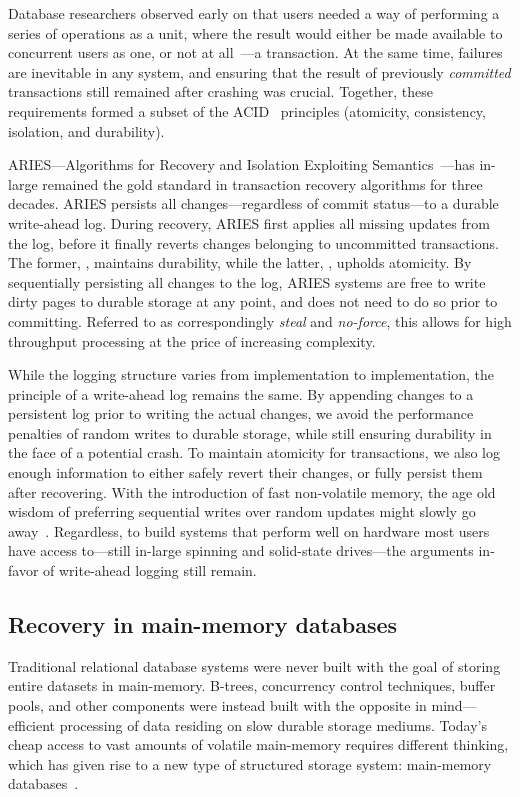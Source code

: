 Database researchers observed early on that users needed a way of
performing a series of operations as a unit, where the result would either be
made available to concurrent users as one, or not at all~\cite{bernstein}---a
transaction. At the same time, failures are inevitable in any system, and
ensuring that the result of previously \textit{committed} transactions still
remained after crashing was crucial. Together, these requirements formed
a subset of the ACID~\cite{acid} principles (atomicity, consistency, isolation,
and durability).

ARIES---Algorithms for Recovery and Isolation Exploiting
Semantics~\cite{aries}---has in-large remained the gold standard in transaction
recovery algorithms for three decades. ARIES persists all changes---regardless
of commit status---to a durable write-ahead log. During recovery, ARIES first
applies all missing updates from the log, before it finally reverts changes
belonging to uncommitted transactions. The former, , maintains
durability, while the latter, , upholds atomicity. By sequentially
persisting all changes to the log, ARIES systems are free to write dirty pages
to durable storage at any point, and does not need to do so prior to committing.
Referred to as correspondingly \textit{steal} and \textit{no-force}, this allows
for high throughput processing at the price of increasing complexity.

While the logging structure varies from implementation to implementation, the
principle of a write-ahead log remains the same. By appending changes to a
persistent log prior to writing the actual changes, we avoid the performance
penalties of random writes to durable storage, while still ensuring durability
in the face of a potential crash. To maintain atomicity for transactions, we
also log enough information to either safely revert their changes, or fully
persist them after recovering. With the introduction of fast non-volatile
memory, the age old wisdom of preferring sequential writes over random updates
might slowly go away~\cite{mars, wbl}. Regardless, to build systems that perform
well on hardware most users have access to---still in-large spinning and
solid-state drives---the arguments in-favor of write-ahead logging still remain.

\subsection{Recovery in main-memory databases}

Traditional relational database systems were never built with the goal of
storing entire datasets in main-memory. B-trees, concurrency control techniques,
buffer pools, and other components were instead built with the opposite in
mind---efficient processing of data residing on slow durable storage mediums.
Today's cheap access to vast amounts of volatile main-memory requires different
thinking, which has given rise to a new type of structured storage system:
main-memory databases~\cite{main-memory}.

